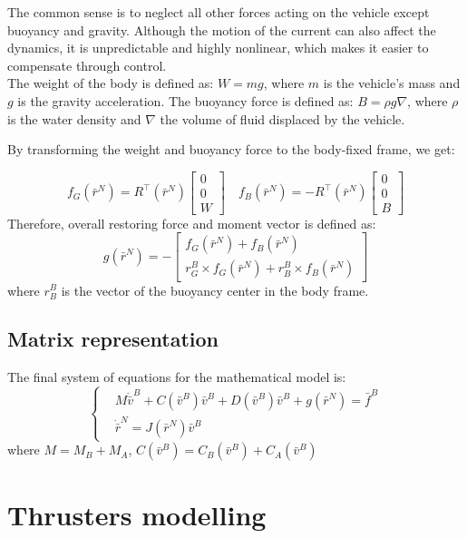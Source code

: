     The common sense is to neglect all other forces acting on the vehicle except buoyancy and gravity. 
    Although the motion of the current can also affect the dynamics, it is unpredictable and highly nonlinear, 
    which makes it easier to compensate through control.\\
    The weight of the body is defined as: $W=m g$, where $m$ is the vehicle's mass and $g$ is the gravity acceleration. 
    The buoyancy force is defined as: $B=\rho g \nabla$, where $\rho$ is the water density and $\nabla$ the volume of fluid displaced by the vehicle. 
    
    By transforming the weight and buoyancy force to the body-fixed frame, we get:

    $$
    f_G\left(\bar{r}^N\right)=R^{\top}\left(\bar{r}^N\right)\left[\begin{array}{l}
    0 \\
    0 \\
    W
    \end{array}\right] \quad f_B\left(\bar{r}^N\right)=-R^{\top}\left(\bar{r}^N\right)\left[\begin{array}{l}
    0 \\
    0 \\
    B
    \end{array}\right]
    $$
    Therefore, overall restoring force and moment vector is defined as:
    $$
    g(\bar{r}^N)=-\left[\begin{array}{c}
    f_G(\bar{r}^N)+f_B(\bar{r}^N) \\
    r_G^B \times f_G(\bar{r}^N)+r_B^B \times f_B(\bar{r}^N)
    \end{array}\right]
    $$
    where $r_B^B$ is the vector of the buoyancy center in the body frame. 

\subsection{Matrix representation}

    The final system of equations for the mathematical model is:
    $$
    \begin{cases}
    & M \dot{\bar{v}}^B + C(\bar{v}^B) \bar{v}^B+D(\bar{v}^B) \bar{v}^B+g(\bar{r}^N)= \bar{f}^B\\
    & \dot{\bar{r}}^N=J(\bar{r}^N) \bar{v}^B
    \end{cases}
    $$
    where
    $M=M_B+M_A$, $C(\bar{v}^B)=C_B(\bar{v}^B)+C_A(\bar{v}^B)$

\section{Thrusters modelling}

